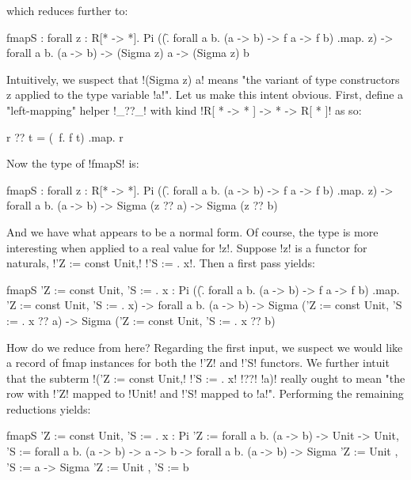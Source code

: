 \documentclass[sigplan,10pt,review]{acmart}\settopmatter{printfolios=true,printccs=false,printacmref=false}
\begin{document}
\Ni which reduces further to:

\begin{rosi}
fmapS : forall z : R[* -> *]. 
        Pi ((\f. forall a b. 
            (a -> b) -> f a -> f b) .map. z) -> 
        forall a b. (a -> b) -> (Sigma z) a -> (Sigma z) b
\end{rosi}

\Ni Intuitively, we suspect that !(Sigma z) a! means "the variant of type constructors z applied to the type variable !a!". Let us make this intent obvious. First, define a "left-mapping" helper !_??_!  with kind !R[ * -> * ] -> * -> R[ * ]!  as so:

\begin{rosi}
  r ?? t = (\ f. f t) .map. r
\end{rosi}

\Ni Now the type of !fmapS! is:

\begin{rosi}
fmapS : forall z : R[* -> *]. 
        Pi ((\f. forall a b. 
            (a -> b) -> f a -> f b) .map. z) -> 
        forall a b. (a -> b) -> Sigma (z ?? a) -> Sigma (z ?? b)
\end{rosi}

\Ni And we have what appears to be a normal form. Of course, the type is more interesting when applied to a real value for !z!. Suppose !z! is a functor for naturals, !{'Z := const Unit,! !'S := \x. x}!. Then a first pass yields:

\begin{rosi}
fmapS {'Z := const Unit, 'S := \x. x} : 
        Pi ((\f. forall a b. (a -> b) -> f a -> f b) 
          .map. {'Z := const Unit, 'S := \x. x}) -> 
        forall a b. (a -> b) -> 
        Sigma ({'Z := const Unit, 'S := \x. x} ?? a) -> 
        Sigma ({'Z := const Unit, 'S := \x. x} ?? b)
\end{rosi}

How do we reduce from here? Regarding the first input, we suspect we would like a record of fmap instances for both the !'Z! and !'S! functors. We further intuit that the subterm !({'Z := const Unit,! !'S := \x. x}! !??! !a)! really ought to mean "the row with !'Z! mapped to !Unit! and !'S! mapped to !a!". Performing the remaining reductions yields:

\begin{rosi}
fmapS {'Z := const Unit, 'S := \x. x} : 
        Pi {'Z := forall a b. (a -> b) -> Unit -> Unit, 
            'S := forall a b. (a -> b) -> a -> b} -> 
        forall a b. (a -> b) -> 
        Sigma {'Z := Unit , 'S := a} ->
        Sigma {'Z := Unit , 'S := b}
\end{rosi}
\end{document}
